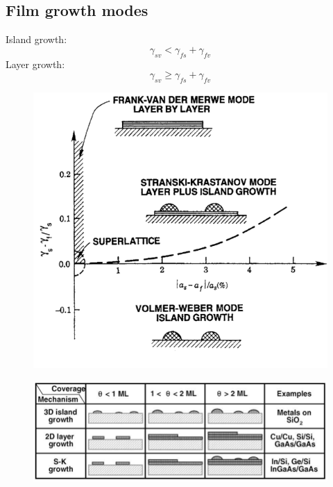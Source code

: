 \subsection{Film growth modes}
Island growth:
\[
 \gamma_{sv} < \gamma_{fs} + \gamma_{fv}
\]
Layer growth:
\[
\gamma_{sv} \ge \gamma_{fs} + \gamma_{fv}
\]
\begin{figure}[!ht]
    \centering
    \includegraphics[width=\columnwidth]{images/layergrowth.png}
    \label{fig:layergrowth}
\end{figure}
\begin{figure}[!ht]
    \centering
    \includegraphics[width=\columnwidth]{images/growthmode2.png}
    \label{fig:growthmode2}
\end{figure}

